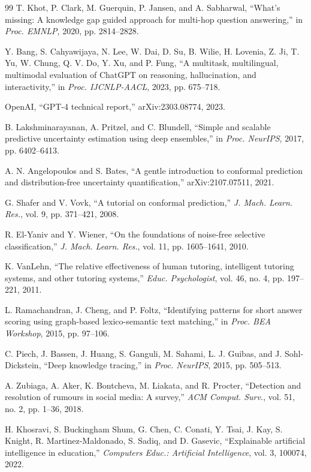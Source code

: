 \documentclass[journal]{IEEEtran}
\begin{document}
\begin{thebibliography}{99}
T. Khot, P. Clark, M. Guerquin, P. Jansen, and A. Sabharwal, ``What's missing: A knowledge gap guided approach for multi-hop question answering,'' in \textit{Proc. EMNLP}, 2020, pp. 2814--2828.

Y. Bang, S. Cahyawijaya, N. Lee, W. Dai, D. Su, B. Wilie, H. Lovenia, Z. Ji, T. Yu, W. Chung, Q. V. Do, Y. Xu, and P. Fung, ``A multitask, multilingual, multimodal evaluation of ChatGPT on reasoning, hallucination, and interactivity,'' in \textit{Proc. IJCNLP-AACL}, 2023, pp. 675--718.

OpenAI, ``GPT-4 technical report,'' arXiv:2303.08774, 2023.

B. Lakshminarayanan, A. Pritzel, and C. Blundell, ``Simple and scalable predictive uncertainty estimation using deep ensembles,'' in \textit{Proc. NeurIPS}, 2017, pp. 6402--6413.

A. N. Angelopoulos and S. Bates, ``A gentle introduction to conformal prediction and distribution-free uncertainty quantification,'' arXiv:2107.07511, 2021.

G. Shafer and V. Vovk, ``A tutorial on conformal prediction,'' \textit{J. Mach. Learn. Res.}, vol. 9, pp. 371--421, 2008.

R. El-Yaniv and Y. Wiener, ``On the foundations of noise-free selective classification,'' \textit{J. Mach. Learn. Res.}, vol. 11, pp. 1605--1641, 2010.

K. VanLehn, ``The relative effectiveness of human tutoring, intelligent tutoring systems, and other tutoring systems,'' \textit{Educ. Psychologist}, vol. 46, no. 4, pp. 197--221, 2011.

L. Ramachandran, J. Cheng, and P. Foltz, ``Identifying patterns for short answer scoring using graph-based lexico-semantic text matching,'' in \textit{Proc. BEA Workshop}, 2015, pp. 97--106.

C. Piech, J. Bassen, J. Huang, S. Ganguli, M. Sahami, L. J. Guibas, and J. Sohl-Dickstein, ``Deep knowledge tracing,'' in \textit{Proc. NeurIPS}, 2015, pp. 505--513.

A. Zubiaga, A. Aker, K. Bontcheva, M. Liakata, and R. Procter, ``Detection and resolution of rumours in social media: A survey,'' \textit{ACM Comput. Surv.}, vol. 51, no. 2, pp. 1--36, 2018.

H. Khosravi, S. Buckingham Shum, G. Chen, C. Conati, Y. Tsai, J. Kay, S. Knight, R. Martinez-Maldonado, S. Sadiq, and D. Gasevic, ``Explainable artificial intelligence in education,'' \textit{Computers Educ.: Artificial Intelligence}, vol. 3, 100074, 2022.


\end{thebibliography}
\end{document}
